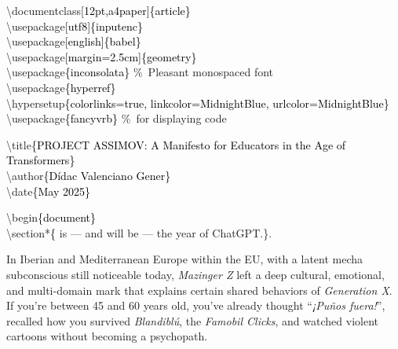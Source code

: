 \documentclass[12pt,a4paper]{article}
\title{}
\author{}
\date{}
\begin{document}
\noindent
\ttfamily
\textcolor{mygreen}{\textbackslash documentclass}\textcolor{black}{[12pt,a4paper]\{article\}}\\
\textcolor{mygreen}{\textbackslash usepackage}\textcolor{black}{[utf8]\{inputenc\}}\\
\textcolor{mygreen}{\textbackslash usepackage}\textcolor{black}{[english]\{babel\}}\\
\textcolor{mygreen}{\textbackslash usepackage}\textcolor{black}{[margin=2.5cm]\{geometry\}}\\
\textcolor{mygreen}{\textbackslash usepackage}\textcolor{black}{\{inconsolata\}} \textcolor{mygray}{\%\ Pleasant monospaced font}\\
\textcolor{mygreen}{\textbackslash usepackage}\textcolor{black}{\{hyperref\}}\\
\textcolor{mygreen}{\textbackslash hypersetup}\textcolor{black}{\{colorlinks=true, linkcolor=MidnightBlue, urlcolor=MidnightBlue\}}\\
\textcolor{mygreen}{\textbackslash usepackage}\textcolor{black}{\{fancyvrb\}} \textcolor{mygray}{\%\ for displaying code}

\medskip

\noindent\textcolor{mygreen}{\textbackslash title}\textcolor{black}{\{PROJECT ASSIMOV: A Manifesto for Educators in the Age of Transformers\}}\\
\textcolor{mygreen}{\textbackslash author}\textcolor{black}{\{Dídac Valenciano Gener\}}\\
\textcolor{mygreen}{\textbackslash date}\textcolor{black}{\{May 2025\}}

\medskip

\noindent\textcolor{mygreen}{\textbackslash begin}\textcolor{black}{\{document\}}\\
\textcolor{mygreen}{\textbackslash section*}\textcolor{black} \{ is — and will be — the year of ChatGPT.\}.\\

				\bigskip
				
				In Iberian and Mediterranean Europe within the EU, with a latent mecha subconscious still noticeable today, \emph{Mazinger Z} left a deep cultural, emotional, and multi-domain mark that explains certain shared behaviors of \emph{Generation X}. If you're between 45 and 60 years old, you've already thought “\emph{¡Puños fuera!}”, recalled how you survived \emph{Blandiblú}, the \emph{Famobil Clicks}, and watched violent cartoons without becoming a psychopath.
				
				\medskip
				
\end{document}
